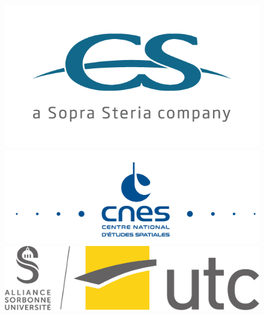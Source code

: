 \begin{titlepage}
\begin{center}
        \begin{figure}[h!]
            \begin{minipage}{0.25\linewidth}
                \vspace{0.6cm}
                \centering\includegraphics[width=\linewidth]{Images/General/Logo_CS.png}
            \end{minipage}
            \begin{minipage}{0.48\linewidth}
                \centering\includegraphics[width=\linewidth]{Images/General/Logo_CNES.png}
            \end{minipage}
            \begin{minipage}{0.25\linewidth}
                \vspace{0.6cm}
                \centering\includegraphics[width=\linewidth]{Images/General/Logo_UTC.jpg}
            \end{minipage}
        \end{figure}
    \end{center}
\end{titlepage}